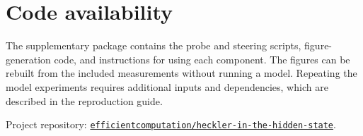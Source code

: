 \documentclass[11pt,letterpaper]{article}
\begin{document}
\section*{Code availability}
The supplementary package contains the probe and steering scripts, figure-generation code, and instructions for using each component. The figures can be rebuilt from the included measurements without running a model. Repeating the model experiments requires additional inputs and dependencies, which are described in the reproduction guide.

\noindent Project repository: \href{https://github.com/efficientcomputation/heckler-in-the-hidden-state}{\nolinkurl{efficientcomputation/heckler-in-the-hidden-state}}.

\FloatBarrier
\begingroup
\small

\endgroup

\clearpage

\end{document}
